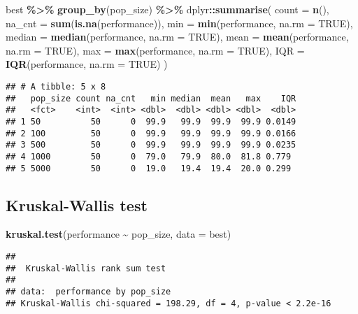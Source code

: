\documentclass[
]{book}
\newenvironment{Shaded}{\begin{snugshade}}{\end{snugshade}}
\newcommand{\AttributeTok}[1]{\textcolor[rgb]{0.13,0.29,0.53}{#1}}
\newcommand{\ConstantTok}[1]{\textcolor[rgb]{0.56,0.35,0.01}{#1}}
\newcommand{\FunctionTok}[1]{\textcolor[rgb]{0.13,0.29,0.53}{\textbf{#1}}}
\newcommand{\NormalTok}[1]{#1}
\newcommand{\SpecialCharTok}[1]{\textcolor[rgb]{0.81,0.36,0.00}{\textbf{#1}}}
\begin{document}
\begin{Shaded}
\begin{Highlighting}[]
\NormalTok{best }\SpecialCharTok{\%\textgreater{}\%}
  \FunctionTok{group\_by}\NormalTok{(pop\_size) }\SpecialCharTok{\%\textgreater{}\%}
\NormalTok{  dplyr}\SpecialCharTok{::}\FunctionTok{summarise}\NormalTok{(}
    \AttributeTok{count =} \FunctionTok{n}\NormalTok{(),}
    \AttributeTok{na\_cnt =} \FunctionTok{sum}\NormalTok{(}\FunctionTok{is.na}\NormalTok{(performance)),}
    \AttributeTok{min =} \FunctionTok{min}\NormalTok{(performance, }\AttributeTok{na.rm =} \ConstantTok{TRUE}\NormalTok{),}
    \AttributeTok{median =} \FunctionTok{median}\NormalTok{(performance, }\AttributeTok{na.rm =} \ConstantTok{TRUE}\NormalTok{),}
    \AttributeTok{mean =} \FunctionTok{mean}\NormalTok{(performance, }\AttributeTok{na.rm =} \ConstantTok{TRUE}\NormalTok{),}
    \AttributeTok{max =} \FunctionTok{max}\NormalTok{(performance, }\AttributeTok{na.rm =} \ConstantTok{TRUE}\NormalTok{),}
    \AttributeTok{IQR =} \FunctionTok{IQR}\NormalTok{(performance, }\AttributeTok{na.rm =} \ConstantTok{TRUE}\NormalTok{)}
\NormalTok{  )}
\end{Highlighting}
\end{Shaded}

\begin{verbatim}
## # A tibble: 5 x 8
##   pop_size count na_cnt   min median  mean   max    IQR
##   <fct>    <int>  <int> <dbl>  <dbl> <dbl> <dbl>  <dbl>
## 1 50          50      0  99.9   99.9  99.9  99.9 0.0149
## 2 100         50      0  99.9   99.9  99.9  99.9 0.0166
## 3 500         50      0  99.9   99.9  99.9  99.9 0.0235
## 4 1000        50      0  79.0   79.9  80.0  81.8 0.779 
## 5 5000        50      0  19.0   19.4  19.4  20.0 0.299
\end{verbatim}

\hypertarget{kruskal-wallis-test}{%
\subsection{Kruskal-Wallis test}\label{kruskal-wallis-test}}

\begin{Shaded}
\begin{Highlighting}[]
\FunctionTok{kruskal.test}\NormalTok{(performance }\SpecialCharTok{\textasciitilde{}}\NormalTok{ pop\_size, }\AttributeTok{data =}\NormalTok{ best)}
\end{Highlighting}
\end{Shaded}

\begin{verbatim}
## 
##  Kruskal-Wallis rank sum test
## 
## data:  performance by pop_size
## Kruskal-Wallis chi-squared = 198.29, df = 4, p-value < 2.2e-16
\end{verbatim}
\end{document}
